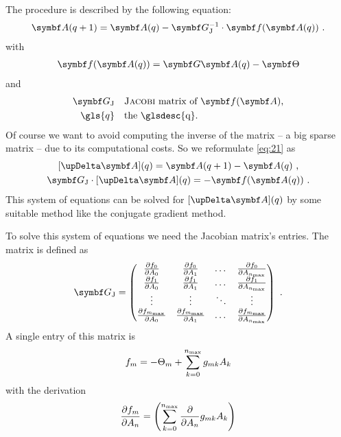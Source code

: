 The  procedure \parencite{Wikipedia:Newton} is
described by the following equation: 
\begin{gather}
  \label{eq:21}
  \vect{A}(q+1)=\vect{A}(q)-\jacmatr^{-1}\cdot\vect{f}(\vect{A}(q))\text{~.}
\end{gather}
with
\begin{gather*}
  \vect{f}(\vect{A}(q))=\matr{G}\vect{A}(q)-\vect{\Theta}
\end{gather*}
and
\begin{align*}
  \jacmatr 
  & \quad\text{\personname{Jacobi} matrix of $\vect{f}(\vect{A})$,} \\
  \gls{q} & \quad\text{the \glsdesc{q}.}
\end{align*}
Of course we want to avoid computing the inverse of the
 matrix \jacmatr{} -- a big sparse matrix -- due to its
computational costs.  So we reformulate \eqref{eq:21} as
\begin{gather}
  \label{eq:41}
  [\upDelta\vect{A}](q)=\vect{A}(q+1)-\vect{A}(q)\text{~,} \\
  \jacmatr\cdot[\upDelta\vect{A}](q)=-\vect{f}(\vect{A}(q))\text{~.}
\end{gather}
This system of equations can be solved for $[\upDelta\vect{A}](q)$ by some
suitable method like the conjugate gradient method.
\par To solve this system of equations we need the Jacobian matrix's
entries.  The  matrix
 is defined as
\begin{gather}
  \label{eq:29}
  \jacmatr =
  \begin{pmatrix}
    \partdiff{f_0}{A_0} & \partdiff{f_0}{A_1} & \dots &
    \partdiff{f_0}{A_{\xmax{n}}} \\
    \partdiff{f_1}{A_0} & \partdiff{f_1}{A_1} & \dots &
    \partdiff{f_1}{A_{\xmax{n}}} \\
    \vdots & \vdots & \ddots & \vdots \\
    \partdiff{f_{\xmax{m}}}{A_0} & \partdiff{f_{\xmax{m}}}{A_1} &
    \dots & \partdiff{f_{\xmax{m}}}{A_{\xmax{n}}}
  \end{pmatrix}\text{~.}
\end{gather}
A single entry of this matrix is
\begin{gather}
  \label{eq:23}
  f_m=-\Theta_m+\sum_{k=0}^{n_{\text{max}}}g_{mk}A_k
\end{gather}
with the derivation
\begin{gather}
  \label{eq:24}
  \frac{\partial f_m}{\partial A_n}
  =\left(\sum_{k=0}^{n_{\text{max}}}\frac{\partial}{\partial A_n}g_{mk}A_k\right)
\end{gather}
